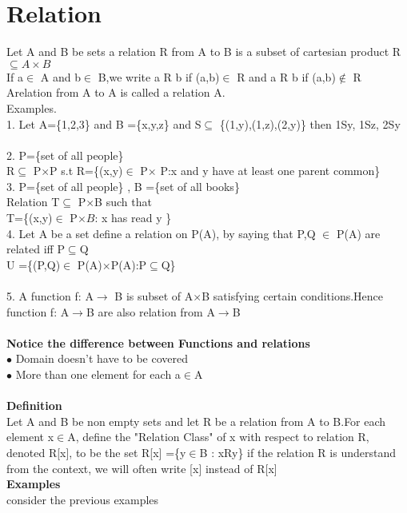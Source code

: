 \documentclass[a4paper,english,12pt]{article}
\begin{document}
\section{Relation}
Let A and B be sets a relation R from A to B is a subset of cartesian product R$\subseteq A \times B $\\
If a$\in$ A and b$\in$ B,we write a R b if (a,b)$\in$ R and a R b if (a,b)$\notin$ R \\
Arelation from A to A is called a relation A.\\
Examples.\\
1. Let A=\{1,2,3\} and B =\{x,y,z\} and S$\subseteq$ \{(1,y),(1,z),(2,y)\} then 1Sy, 1Sz, 2Sy\\\\
2. P=\{set of all people\}\\
R$\subseteq$ P$\times$P s.t R=\{(x,y)$\in$ P$\times$ P:x and y have at least one parent common\}\\
3. P=\{set of all people\} , B =\{set of all books\}\\
Relation T$\subseteq$ P$\times$B such that \\
T=\{(x,y)$\in$ P$\times B$: x has read y \}\\
4. Let A be a set define a relation on P(A), by saying that P,Q $\in$ P(A) are related iff P$\subseteq$Q\\
U =\{(P,Q)$\in$ P(A)$\times$P(A):P$\subseteq$Q\}\\\\
5. A function f: A$\rightarrow$ B is subset of A$\times$B satisfying certain conditions.Hence function f: A$\rightarrow$B are also relation from A$\rightarrow$B\\\\
\textbf{Notice the difference between Functions and relations}\\
$\bullet$ Domain doesn't have to be covered\\
$\bullet$ More than one element for each a$\in$A\\\\
\textbf{Definition}\\
Let A and B be non empty sets and let R be a relation from A to B.For each element x$\in$A, define the "Relation Class" of x with respect to relation R, denoted R[x], to be the set R[x] =\{y$\in$B : xRy\} if the relation R is understand from the context, we will often write [x] instead of R[x]\\
\textbf{Examples}\\
consider the previous examples \\
\end{document}
